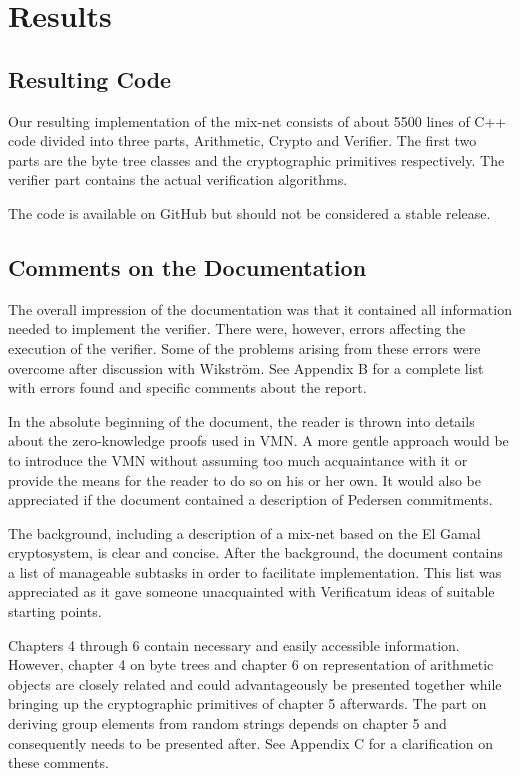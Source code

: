 \section{Results}

\subsection{Resulting Code}

Our resulting implementation of the mix-net consists of about 5500 lines of C++ code divided into three parts, Arithmetic, Crypto and Verifier. The first two parts are the byte tree classes and the cryptographic primitives respectively. The verifier part contains the actual verification algorithms.

The code is available on GitHub\cite{github} but should not be considered a stable release.


\subsection{Comments on the Documentation}

The overall impression of the documentation was that it contained all
information needed to implement the verifier. There were, however,
errors affecting the execution of the verifier. Some of the problems arising from these
errors were overcome after discussion with Wikström. See Appendix B
for a complete list with errors found and specific comments about the
report.

In the absolute beginning of the document, the reader is thrown into
details about the zero-knowledge proofs used in VMN. A more gentle
approach would be to introduce the VMN without assuming too much
acquaintance with it or provide the means for the reader to do so on
his or her own. It would also be appreciated if the document contained
a description of Pedersen commitments.

The background, including a description of a mix-net based on the El
Gamal cryptosystem, is clear and concise. After the background, the
document contains a list of manageable subtasks in order to facilitate
implementation. This list was appreciated as it gave someone
unacquainted with Verificatum ideas of suitable starting points.

Chapters 4 through 6 contain necessary and easily accessible
information. However, chapter 4 on byte trees and chapter 6 on
representation of arithmetic objects are closely related and could
advantageously be presented together while bringing up the
cryptographic primitives of chapter 5 afterwards. The part on deriving
group elements from random strings depends on chapter 5 and
consequently needs to be presented after. See Appendix C for a
clarification on these comments.

